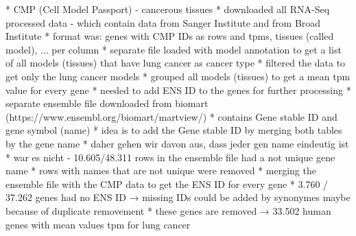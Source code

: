 {\color{lightgray}
    * CMP (Cell Model Passport) - cancerous tissues
        * downloaded all RNA-Seq processed data - which contain data from Sanger Institute and from Broad Institute
        * format was: genes with CMP IDs as rows and tpms, tissues (called model), ... per column
        * separate file loaded with model annotation to get a list of all models (tissues) that have lung cancer as cancer type
        * filtered the data to get only the lung cancer models
        * grouped all models (tissues) to get a mean tpm value for every gene
        * needed to add ENS ID to the genes for further processing
        * separate ensemble file downloaded from biomart (https://www.ensembl.org/biomart/martview/)
        * contains Gene stable ID and gene symbol (name)
        * idea is to add the Gene stable ID by merging both tables by the gene name
        * daher gehen wir davon aus, dass jeder gen name eindeutig ist
        * war es nicht - 10.605/48.311 rows in the ensemble file had a not unique gene name
        * rows with names that are not unique were removed
        * merging the ensemble file with the CMP data to get the ENS ID for every gene
        * 3.760 / 37.262 genes had no ENS ID → missing IDs could be added by synonymes maybe because of duplicate removement
        * these genes are removed
    → 33.502 human genes with mean values tpm for lung cancer
}